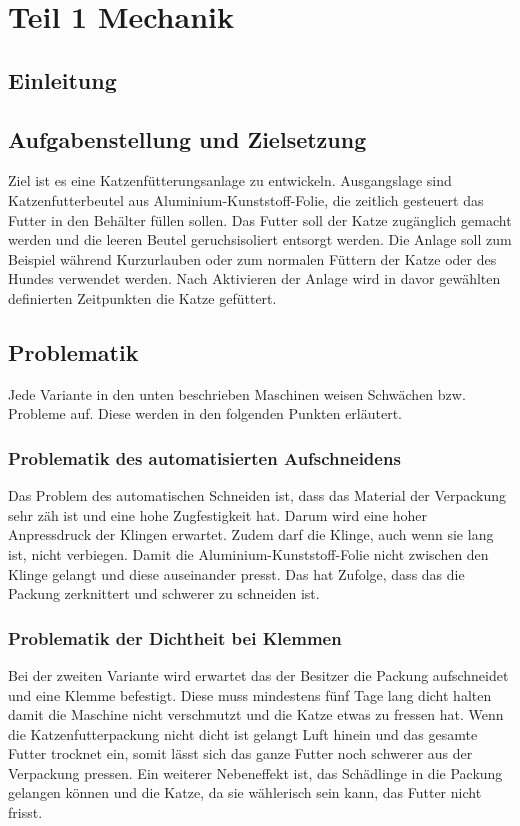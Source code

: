 \chapter{Teil 1 Mechanik}
\section{Einleitung}
\section{Aufgabenstellung und Zielsetzung}

Ziel ist es eine Katzenfütterungsanlage zu entwickeln. Ausgangslage sind Katzenfutterbeutel aus Aluminium-Kunststoff-Folie, die zeitlich gesteuert das Futter in den Behälter füllen sollen. Das Futter soll der Katze zugänglich gemacht werden und die leeren Beutel geruchsisoliert entsorgt werden. Die Anlage soll zum Beispiel während Kurzurlauben oder zum normalen Füttern der Katze oder des Hundes verwendet werden. Nach Aktivieren der Anlage wird in davor gewählten definierten Zeitpunkten die Katze gefüttert. 


\section{Problematik}

Jede Variante in den unten beschrieben Maschinen weisen Schwächen bzw. Probleme auf. Diese werden in den folgenden Punkten erläutert.

\subsection{Problematik des automatisierten Aufschneidens}

Das Problem des automatischen Schneiden ist, dass das Material der Verpackung sehr zäh ist und eine hohe Zugfestigkeit hat. Darum wird eine hoher Anpressdruck der Klingen erwartet. Zudem darf die Klinge, auch wenn sie lang ist, nicht verbiegen. Damit die Aluminium-Kunststoff-Folie nicht zwischen den Klinge gelangt und diese auseinander presst. Das hat Zufolge, dass das die Packung zerknittert und schwerer zu schneiden ist. 

\subsection{Problematik der Dichtheit bei Klemmen}

Bei der zweiten Variante wird erwartet das der Besitzer die Packung aufschneidet und eine Klemme befestigt. Diese muss mindestens fünf Tage lang dicht halten damit die Maschine nicht verschmutzt und die Katze etwas zu fressen hat. Wenn die Katzenfutterpackung nicht dicht ist gelangt Luft hinein und das gesamte Futter trocknet ein, somit lässt sich das ganze Futter noch schwerer aus der Verpackung pressen. Ein weiterer Nebeneffekt ist, das Schädlinge in die Packung gelangen können und die Katze, da sie wählerisch sein kann, das Futter nicht frisst.

